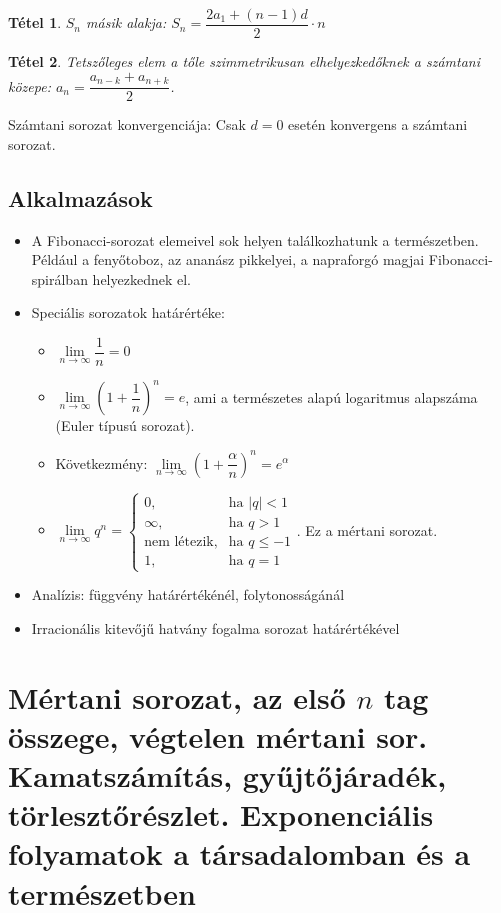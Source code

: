 \documentclass[12pt,a4paper]{article}
\newtheorem{theorem}{Tétel} [section]
\begin{document}
\begin{theorem}
$S_n$ másik alakja: $S_n=\dfrac{2a_1+(n-1)d}{2}\cdot n$
\end{theorem}

\begin{theorem}
Tetszőleges elem a tőle szimmetrikusan elhelyezkedőknek a számtani közepe: $a_n=\dfrac{a_{n-k}+a_{n+k}}{2}$.
\end{theorem}

Számtani sorozat konvergenciája: Csak $d = 0$ esetén konvergens a számtani sorozat.

\subsection{Alkalmazások}
\begin{itemize}
\item A Fibonacci-sorozat elemeivel sok helyen találkozhatunk a természetben. Például a fenyőtoboz, az ananász pikkelyei, a napraforgó magjai Fibonacci-spirálban helyezkednek el.
\item  Speciális sorozatok határértéke:
\begin{itemize}
\item $\lim\limits_{n\to \infty}\dfrac{1}{n}=0$
\item $\lim\limits_{n\to \infty}\left(1+\dfrac{1}{n} \right)^n=e$, ami a természetes alapú logaritmus alapszáma (Euler típusú sorozat).
\item Következmény: $\lim\limits_{n\to \infty}\left(1+\dfrac{\alpha}{n} \right)^n=e^\alpha$
\item $\lim\limits_{n\to \infty} q^n=\begin{cases} 0, & \text{ha } |q|<1 \\ \infty, & \text{ha } q>1 \\ \text{nem létezik}, & \text{ha } q\leq -1 \\ 1, & \text{ha }q=1 \end{cases}$. Ez a mértani sorozat.
\end{itemize}
\item Analízis: függvény határértékénél, folytonosságánál
\item Irracionális kitevőjű hatvány fogalma sorozat határértékével
\end{itemize}
\newpage






\section{Mértani sorozat, az első $n$ tag összege, végtelen mértani sor. Kamatszámítás, gyűjtőjáradék, törlesztőrészlet. Exponenciális folyamatok a társadalomban és a természetben}
\end{document}
